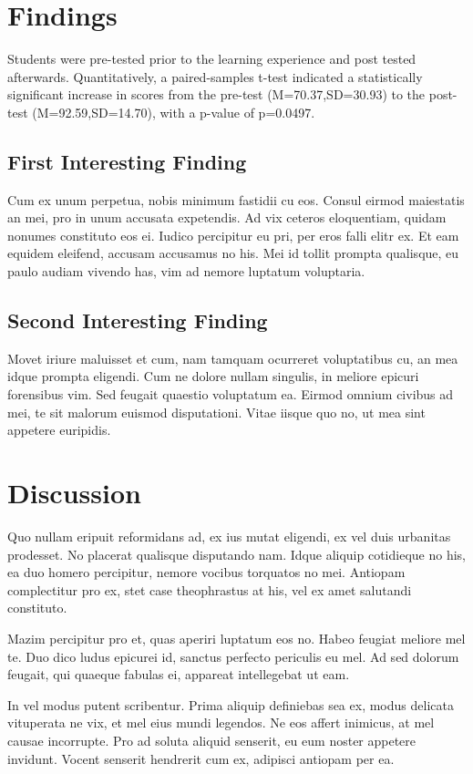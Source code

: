 \documentclass[letterpaper]{article}
\begin{document}
\section{Findings}
Students were pre-tested prior to the learning experience and post tested afterwards. Quantitatively, a paired-samples t-test indicated a statistically significant increase in scores from the pre-test (M=70.37,SD=30.93) to the post-test (M=92.59,SD=14.70), with a p-value of p=0.0497.

\subsection{First Interesting Finding}
Cum ex unum perpetua, nobis minimum fastidii cu eos. Consul eirmod maiestatis an mei, pro in unum accusata expetendis. Ad vix ceteros eloquentiam, quidam nonumes constituto eos ei. Iudico percipitur eu pri, per eros falli elitr ex. Et eam equidem eleifend, accusam accusamus no his. Mei id tollit prompta qualisque, eu paulo audiam vivendo has, vim ad nemore luptatum voluptaria.

\subsection{Second Interesting Finding}
Movet iriure maluisset et cum, nam tamquam ocurreret voluptatibus cu, an mea idque prompta eligendi. Cum ne dolore nullam singulis, in meliore epicuri forensibus vim. Sed feugait quaestio voluptatum ea. Eirmod omnium civibus ad mei, te sit malorum euismod disputationi. Vitae iisque quo no, ut mea sint appetere euripidis.

\section{Discussion}
Quo nullam eripuit reformidans ad, ex ius mutat eligendi, ex vel duis urbanitas prodesset. No placerat qualisque disputando nam. Idque aliquip cotidieque no his, ea duo homero percipitur, nemore vocibus torquatos no mei. Antiopam complectitur pro ex, stet case theophrastus at his, vel ex amet salutandi constituto.

Mazim percipitur pro et, quas aperiri luptatum eos no. Habeo feugiat meliore mel te. Duo dico ludus epicurei id, sanctus perfecto periculis eu mel. Ad sed dolorum feugait, qui quaeque fabulas ei, appareat intellegebat ut eam.

In vel modus putent scribentur. Prima aliquip definiebas sea ex, modus delicata vituperata ne vix, et mel eius mundi legendos. Ne eos affert inimicus, at mel causae incorrupte. Pro ad soluta aliquid senserit, eu eum noster appetere invidunt. Vocent senserit hendrerit cum ex, adipisci antiopam per ea.
\end{document}
